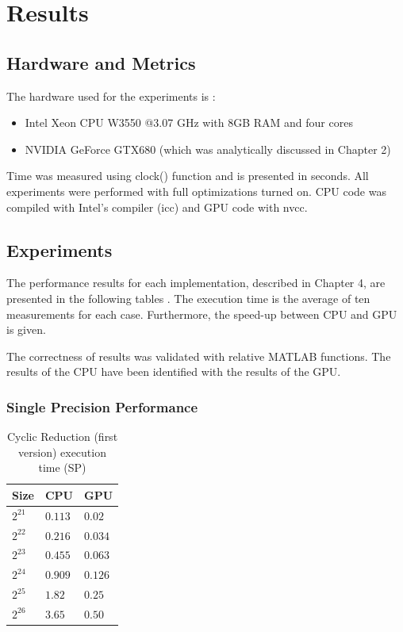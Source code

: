 
\chapter{Results}
\section{Hardware and Metrics}
The hardware used for the experiments is :\begin{itemize}
  \item Intel Xeon CPU W3550 @3.07 GHz with 8GB RAM and four cores
  \item NVIDIA GeForce GTX680 (which was analytically discussed in Chapter 2)
\end{itemize}Time was measured using clock() function and is presented in seconds.
All experiments were performed with full optimizations turned on. CPU code was compiled with Intel's compiler (icc) and GPU code with nvcc.
\section{Experiments}
The performance results for each implementation, described in Chapter 4, are presented in the following tables . The execution time is the average of ten measurements for each case. Furthermore, the speed-up between CPU and GPU is given.

The correctness of results was validated with relative MATLAB functions. The results of the CPU have been identified with the results of the GPU.
\newpage
\subsection{Single Precision Performance}


  

\begin{table}[H]
\caption{Cyclic Reduction (first version) execution time (SP)} 
\centering 
\begin{tabular}{| l | p{3cm} | p{3cm} |} 
\hline\hline 
Size & CPU & GPU  \\ [0.8ex] 
\hline 
$2^{21}$ & $0.113$ & $0.02$\\ 
$2^{22}$ & $0.216$ & $0.034$\\
$2^{23}$ & $0.455$ & $0.063$\\
$2^{24}$ & $0.909$ & $0.126$\\
$2^{25}$ & $1.82$ & $0.25$ \\ 
$2^{26}$ & $3.65$ & $0.50$ \\[1ex] 
\hline 
\end{tabular}
\label{table:cr_first} 
\end{table}

